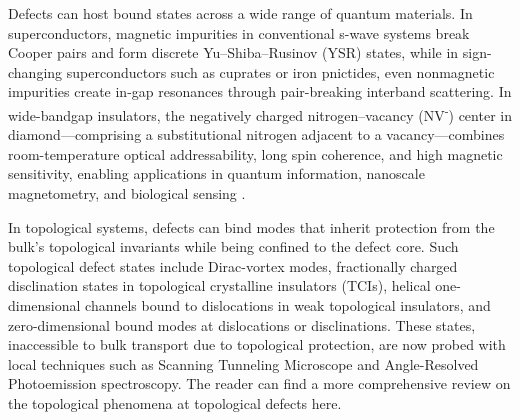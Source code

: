 Defects can host bound states across a wide range of quantum materials. In superconductors, magnetic impurities in conventional s-wave systems break Cooper pairs and form discrete Yu–Shiba–Rusinov (YSR) states\cite{pasnooriRiseFallYuShibaRusinov2022}\cite{ortuzarYuShibaRusinovStatesTwodimensional2022}, while in sign-changing superconductors such as cuprates or iron pnictides, even nonmagnetic impurities create in-gap resonances through pair-breaking interband scattering\cite{mashkooriImpurityBoundStates2017}\cite{alloulDefectsCorrelatedMetals2009}. In wide-bandgap insulators, the negatively charged nitrogen–vacancy (NV\textsuperscript{-}) center in diamond—comprising a substitutional nitrogen adjacent to a vacancy—combines room-temperature optical addressability, long spin coherence, and high magnetic sensitivity, enabling applications in quantum information, nanoscale magnetometry, and biological sensing \cite{dohertyNitrogenvacancyColourCentre2013}.

In topological systems, defects can bind modes that inherit protection from the bulk’s topological invariants while being confined to the defect core. Such topological defect states include Dirac-vortex modes\cite{gaoMajoranalikeZeroModes2019}\cite{menssenPhotonicTopologicalMode2020}, fractionally charged disclination states in topological crystalline insulators (TCIs)\cite{liuBulkdisclinationCorrespondenceTopological2021}\cite{petersonTrappedFractionalCharges2021}, helical one-dimensional channels bound to dislocations in weak topological insulators\cite{nayakResolvingTopologicalClassification2019}\cite{yeTopologicalDislocationModes2022}\cite{xueObservationDislocationInducedTopological2021}, and zero-dimensional bound modes at dislocations or disclinations\cite{grinbergTrappedStateDislocation2020}\cite{pauloseTopologicalModesBound2015}\cite{liTopologicalLighttrappingDislocation2018}\cite{dengObservationDegenerateZeroEnergy2022}. These states, inaccessible to bulk transport due to topological protection, are now probed with local techniques such as Scanning Tunneling Microscope and Angle-Resolved Photoemission spectroscopy. The reader can find a more comprehensive review on the topological phenomena at topological defects here\cite{linTopologicalPhenomenaTopological2022}.

\vspace{1cm}


